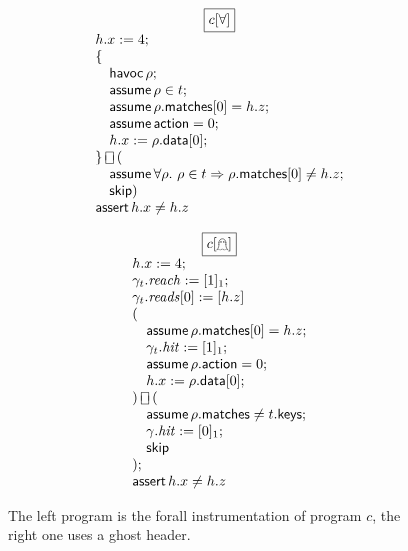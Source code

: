 \documentclass{article}
\newcommand{\matches}{\mathsf{matches}}
\newcommand{\action}{\mathsf{action}}
\newcommand{\keys}{\mathsf{keys}}
\newcommand{\data}{\mathsf{data}}
\newcommand{\reach}{\mathit{\mathit{reach}}}
\newcommand{\hit}{\mathit{hit}}
\newcommand{\reads}{\mathit{reads}}
\newcommand{\assert}{\mathop{\mathsf{assert}}}
\newcommand{\assume}{\mathop{\mathsf{assume}}}
\newcommand{\choiceop}{\rotatebox[origin=c]{90}{$\sqsubset\!\!\!\sqsupset$}}
\newcommand{\choice}{\mathbin{\choiceop}}
\newcommand{\havoc}[1]{\mathop{\textsf{havoc}}#1}
\newcommand{\SKIP}{\mathsf{skip}}
\newcommand{\instr}{[\forall]}
\newcommand{\ginstr}{[\mathghost]}
\begin{document}
\begin{figure}[H]
  \begin{minipage}[t]{0.5\textwidth}
    \[
    \begin{array}{l}
      \multicolumn 1 c {\boxed{c\instr}} \\
      h.x := 4; \\
      \{\\
      \quad \havoc \rho; \\
      \quad \assume \rho \in t; \\
      \quad \assume \rho.\matches[0] = h.z; \\
      \quad \assume \action = 0; \\
      \quad h.x := \rho.\data[0]; \\
      \}\choice ( \\
      \quad \assume \forall \rho.~\rho \in t \Rightarrow \rho.\matches[0] \neq h.z;\\
      \quad \SKIP
      )\\
      \assert h.x \neq h.z
    \end{array}
    \]
  \end{minipage} \begin{minipage}[t]{0.48\textwidth}
    \[\begin{array}{l}
    \multicolumn 1 c {\boxed{c\ginstr}} \\
    h.x := 4;\\
    \gamma_t.\reach := [1]_1;\\
    \gamma_t.\reads[0] := [h.z]\\
    (\\
    \quad \assume \rho.\matches[0] = h.z; \\
    \quad \gamma_t.\hit := [1]_1; \\
    \quad \assume \rho.\action = 0;\\
    \quad h.x := \rho.\data[0];\\
    ) \choice (\\
    \quad \assume \rho.\matches \neq t.\keys; \\
    \quad \gamma.\hit := [0]_1; \\
    \quad \SKIP \\
    );\\
    \assert h.x \neq h.z \\
    \end{array}
    \]
  \end{minipage}
  \caption{The left program is the forall instrumentation of program $c$, the
    right one uses a ghost header. }
  \label{fig:ex-instr}
\end{figure}
\end{document}
